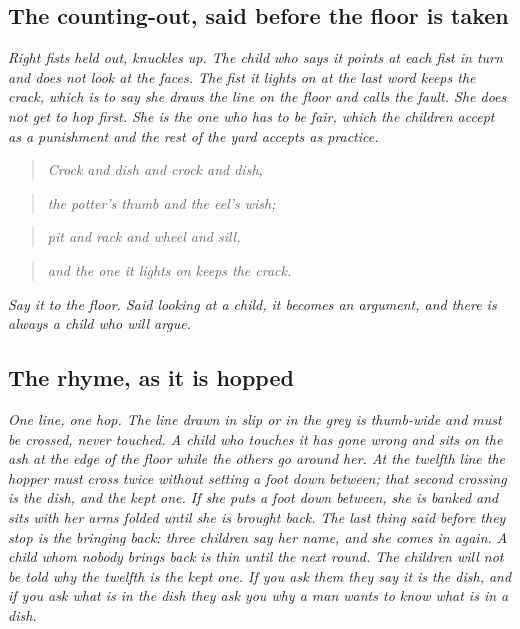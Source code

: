 \documentclass{design/chronicle}
\begin{document}
\subsection*{The counting-out, said before the floor is taken}

\emph{Right fists held out, knuckles up. The child who says it points at each fist in turn and does not look at the faces. The fist it lights on at the last word keeps the crack, which is to say she draws the line on the floor and calls the fault. She does not get to hop first. She is the one who has to be fair, which the children accept as a punishment and the rest of the yard accepts as practice.}

\begin{quote}\itshape Crock and dish and crock and dish,\end{quote}

\begin{quote}\itshape the potter’s thumb and the eel’s wish;\end{quote}

\begin{quote}\itshape pit and rack and wheel and sill,\end{quote}

\begin{quote}\itshape and the one it lights on keeps the crack.\end{quote}

\emph{Say it to the floor. Said looking at a child, it becomes an argument, and there is always a child who will argue.}

\subsection*{The rhyme, as it is hopped}

\emph{One line, one hop. The line drawn in slip or in the grey is thumb-wide and must be crossed, never touched. A child who touches it has gone wrong and sits on the ash at the edge of the floor while the others go around her. At the twelfth line the hopper must cross twice without setting a foot down between; that second crossing is the dish, and the kept one. If she puts a foot down between, she is banked and sits with her arms folded until she is brought back. The last thing said before they stop is the bringing back: three children say her name, and she comes in again. A child whom nobody brings back is thin until the next round. The children will not be told why the twelfth is the kept one. If you ask them they say it is the dish, and if you ask what is in the dish they ask you why a man wants to know what is in a dish.}
\end{document}
